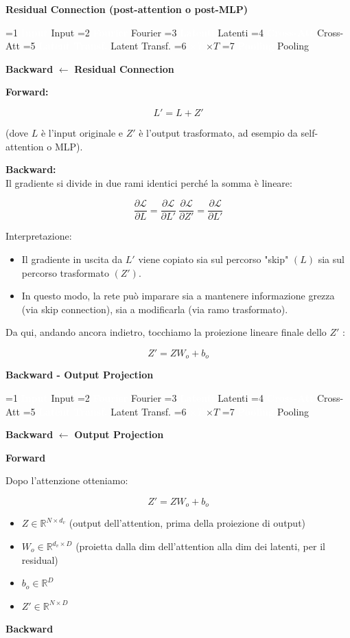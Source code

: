 \documentclass[
  11pt,
]{article}
\newcommand{\currentstep}[1]{%
\begin{tcolorbox}[colback=red!3, colframe=red!40!black, boxrule=0.3pt, arc=2pt,
  left=4pt, right=4pt, top=2pt, bottom=2pt]
{\footnotesize\textbf{Backward} $\longleftarrow$ \textbf{#1}}
\end{tcolorbox}}
\newcommand{\mystripchip}[3]{%
  \setlength{\fboxsep}{2.8pt}%
  \ifnum#3=#1\relax
    \colorbox{seccolor}{\textcolor{white}{\bfseries #2}}%
  \else
    \colorbox{seccolor!8}{\textcolor{seccolor!55}{#2}}%
  \fi}
\newcommand{\mystriparr}{{\fontsize{8}{8}\selectfont\;\textcolor{seccolor!45}{$\rightarrow$}\;}}
\newcommand{\mystrip}[1]{%
\begin{center}
{\sffamily\fontsize{7.5}{9}\selectfont
\mystripchip{1}{Input}{#1}\mystriparr\mystripchip{2}{Fourier}{#1}\mystriparr\mystripchip{3}{Latenti}{#1}\mystriparr%
\mystripchip{4}{Cross-Att}{#1}\mystriparr\mystripchip{5}{Latent Transf.}{#1}\mystriparr%
\mystripchip{6}{$\times T$}{#1}\mystriparr\mystripchip{7}{Pooling}{#1}}
\end{center}}
\renewcommand{\currentstep}[2][0]{%
\mystrip{#1}%
\begin{tcolorbox}[colback=red!3, colframe=red!40!black, boxrule=0.3pt, arc=2pt,
  left=4pt, right=4pt, top=2pt, bottom=2pt]
{\footnotesize\textbf{Backward} $\longleftarrow$ \textbf{#2}}
\end{tcolorbox}}
\begin{document}
\textbf{Residual Connection (post-attention o post-MLP)}

\currentstep[5]{Residual Connection}

\textbf{Forward:}

\[L' = L + Z'\]

(dove \(L\) è l'input originale e \(Z'\) è
l'output trasformato, ad esempio da self-attention o
MLP).

\textbf{Backward:}\\
Il gradiente si divide in due rami identici perché la somma è lineare:

\[\frac{\partial\mathcal{L}}{\partial L} = \frac{\partial\mathcal{L}}{\partial L'}\ \frac{\partial\mathcal{L}}{\partial Z'} = \frac{\partial\mathcal{L}}{\partial L'}\]

Interpretazione:

\begin{itemize}
\item
  Il gradiente in uscita da \(L'\) viene copiato sia sul percorso "skip"
  \((L)\) sia sul percorso trasformato \(\left( Z' \right)\).
\item
  In questo modo, la rete può imparare sia a mantenere informazione
  grezza (via skip connection), sia a modificarla (via ramo
  trasformato).
\end{itemize}

Da qui, andando ancora indietro, tocchiamo la proiezione lineare finale
dello \(Z'\) :

\[Z' = ZW_{o} + b_o\]

\textbf{Backward - Output Projection}

\currentstep[5]{Output Projection}

\textbf{Forward}

Dopo l'attenzione otteniamo:

\[Z' = ZW_{o} + b_{o}\]

\begin{itemize}
\item
  \(Z \in \mathbb{R}^{N \times d_v}\) (output dell'attention, prima della proiezione di output)
\item
  \(W_{o} \in \mathbb{R}^{d_v \times D}\) (proietta dalla dim dell'attention alla dim dei latenti, per il residual)
\item
  \(b_{o} \in \mathbb{R}^{D}\)
\item
  \(Z' \in \mathbb{R}^{N \times D}\)
\end{itemize}

\textbf{Backward}
\end{document}
